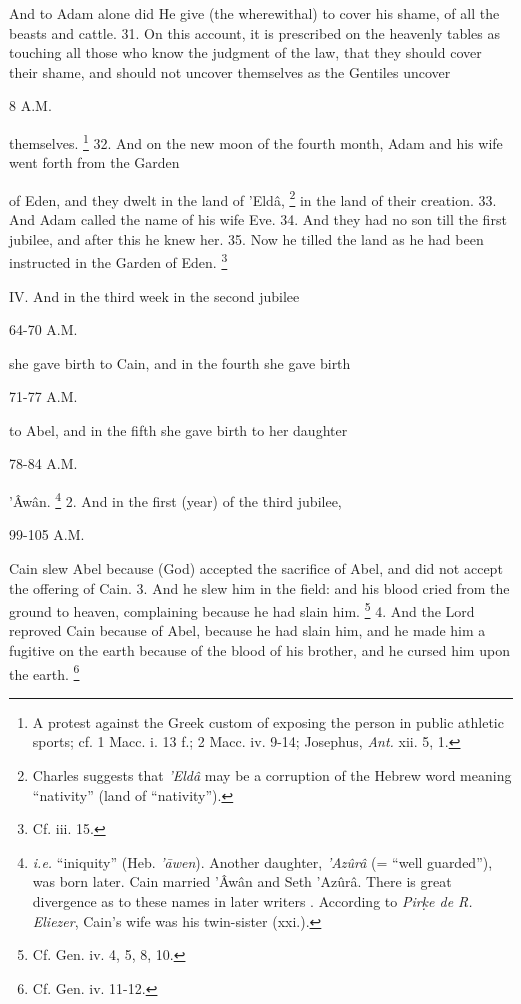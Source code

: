 And to Adam alone did He give (the wherewithal) to cover his shame, of all the beasts and cattle. 31. On this account, it is prescribed on the heavenly tables as touching all those who know the judgment of the law, that they should cover their shame, and should not uncover themselves as the Gentiles uncover

8 A.M.

themselves. \footnote{A protest against the Greek custom of exposing the person in public athletic sports; cf. 1 Macc. i. 13 f.; 2 Macc. iv. 9-14; Josephus, \emph{Ant.} xii. 5, 1.} 32. And on the new moon of the fourth month, Adam and his wife went forth from the Garden

of Eden, and they dwelt in the land of ’Eldâ, \footnote{Charles suggests that \emph{’Eldâ} may be a corruption of the Hebrew word meaning ``nativity'' (land of ``nativity'').} in the land of their creation. 33. And Adam called the name of his wife Eve. 34. And they had no son till the first jubilee, and after this he knew her. 35. Now he tilled the land as he had been instructed in the Garden of Eden. \footnote{Cf. iii. 15.}


IV. And in the third week in the second jubilee

64-70 A.M.

she gave birth to Cain, and in the fourth she gave birth

71-77 A.M.

to Abel, and in the fifth she gave birth to her daughter

78-84 A.M.

’Âwân. \footnote{\emph{i.e.} ``iniquity'' (Heb. \emph{’āwen}). Another daughter, \emph{’Azûrâ} (= ``well guarded''), was born later. Cain married ’Âwân and Seth ’Azûrâ. There is great divergence as to these names in later writers . According to \emph{Pir\d{k}e de R. Eliezer}, Cain's wife was his twin-sister (xxi.).} 2. And in the first (year) of the third jubilee,

99-105 A.M.

Cain slew Abel because (God) accepted the sacrifice of Abel, and did not accept the offering of Cain. 3. And he slew him in the field: and his blood cried from the ground to heaven, complaining because he had slain him. \footnote{Cf. Gen. iv. 4, 5, 8, 10.} 4. And the Lord reproved Cain because of Abel, because he had slain him, and he made him a fugitive on the earth because of the blood of his brother, and he cursed him upon the earth. \footnote{Cf. Gen. iv. 11-12.}

